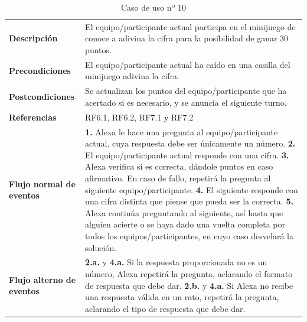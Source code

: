 \begin{table}[H]
	\centering
	\begin{tabular}{|p{3cm}|p{12cm}|}
		\hline
		\rowcolor{lightgray}
		\multicolumn{2}{|c|}{\textbf{CU10}: Minijuego adivina la cifra} \\
		\hline
		\textbf{Descripción} & El equipo/participante actual participa en el minijuego de conoce a adivina la cifra para la posibilidad de ganar 30 puntos. \vspace{0.2cm} \\
		\hline
		\textbf{Precondiciones} & El equipo/participante actual ha caído en una casilla del minijuego adivina la cifra. \vspace{0.2cm} \\
		\hline
		\textbf{Postcondiciones} & Se actualizan los puntos del equipo/participante que ha acertado si es necesario, y se anuncia el siguiente turno. \vspace{0.2cm} \\
		\hline
		\textbf{Referencias} & RF6.1, RF6.2, RF7.1 y RF7.2 \vspace{0.2cm} \\
		\hline
		\textbf{Flujo normal de eventos} &
		\textbf{1.} Alexa le hace una pregunta al equipo/participante actual, cuya respuesta debe ser únicamente un número. \newline
		\vspace{0.2cm}
		\textbf{2.} El equipo/participante actual responde con una cifra. \newline
		\vspace{0.2cm}
		\textbf{3.} Alexa verifica si es correcta, dándole puntos en caso afirmativo. En caso de fallo, repetirá la pregunta al siguiente equipo/participante. \newline
		\vspace{0.2cm} 
		\textbf{4.} El siguiente responde con una cifra distinta que piense que pueda ser la correcta. \newline
		\vspace{0.2cm} 
		\textbf{5.} Alexa continúa preguntando al siguiente, así hasta que alguien acierte o se haya dado una vuelta completa por todos los equipos/participantes, en cuyo caso desvelará la solución.
		\vspace{0.2cm} \\
		\hline
		\textbf{Flujo alterno de eventos} &
		\textbf{2.a.} y \textbf{4.a.} Si la respuesta proporcionada no es un número, Alexa repetirá la pregunta, aclarando el formato de respuesta que debe dar. \newline
		\vspace{0.2cm} 
		\textbf{2.b.} y \textbf{4.a.} Si Alexa no recibe una respuesta válida en un rato, repetirá la pregunta, aclarando el tipo de respuesta que debe dar. \vspace{0.2cm} \\
		\hline
	\end{tabular}
	\caption{Caso de uso nº 10}
	\label{tab:CU10}
\end{table}

